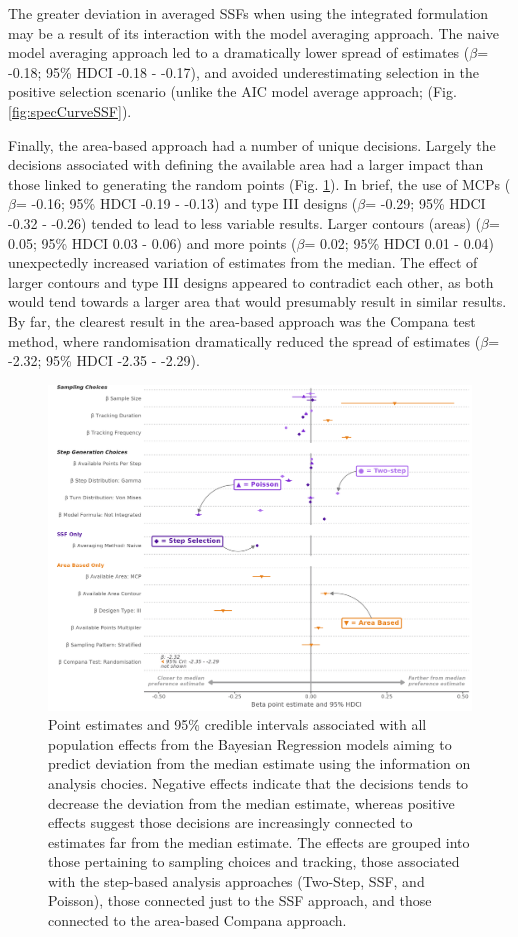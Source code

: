 \documentclass[10pt,a4paper]{article}
\begin{document}
The greater deviation in averaged SSFs when using the integrated formulation may be a result of its interaction with the model averaging approach.
The naive model averaging approach led to a dramatically lower spread of estimates (\(\beta\)= -0.18; 95\% HDCI -0.18 - -0.17), and avoided underestimating selection in the positive selection scenario (unlike the AIC model average approach; (Fig. \ref{fig:specCurveSSF}).

Finally, the area-based approach had a number of unique decisions.
Largely the decisions associated with defining the available area had a larger impact than those linked to generating the random points (Fig. \ref{fig:allEffectsPlot}).
In brief, the use of MCPs (\(\beta\)= -0.16; 95\% HDCI -0.19 - -0.13) and type III designs (\(\beta\)= -0.29; 95\% HDCI -0.32 - -0.26) tended to lead to less variable results.
Larger contours (areas) (\(\beta\)= 0.05; 95\% HDCI 0.03 - 0.06) and more points (\(\beta\)= 0.02; 95\% HDCI 0.01 - 0.04) unexpectedly increased variation of estimates from the median.
The effect of larger contours and type III designs appeared to contradict each other, as both would tend towards a larger area that would presumably result in similar results.
By far, the clearest result in the area-based approach was the Compana test method, where randomisation dramatically reduced the spread of estimates (\(\beta\)= -2.32; 95\% HDCI -2.35 - -2.29).

\begin{figure}
\includegraphics[width=1\linewidth]{../figures/_allEffectsPlot} \caption{Point estimates and 95\% credible intervals associated  with all population effects from the Bayesian Regression models aiming to predict deviation from the median estimate using the information on analysis chocies. Negative effects indicate that the decisions tends to decrease the deviation from the median estimate, whereas positive effects suggest those decisions are increasingly connected to estimates far from the median estimate. The effects are grouped into those pertaining to sampling choices and tracking, those associated with the step-based analysis approaches (Two-Step, SSF, and Poisson), those connected just to the SSF approach, and those connected to the area-based Compana approach.}\label{fig:allEffectsPlot}
\end{figure}
\end{document}
